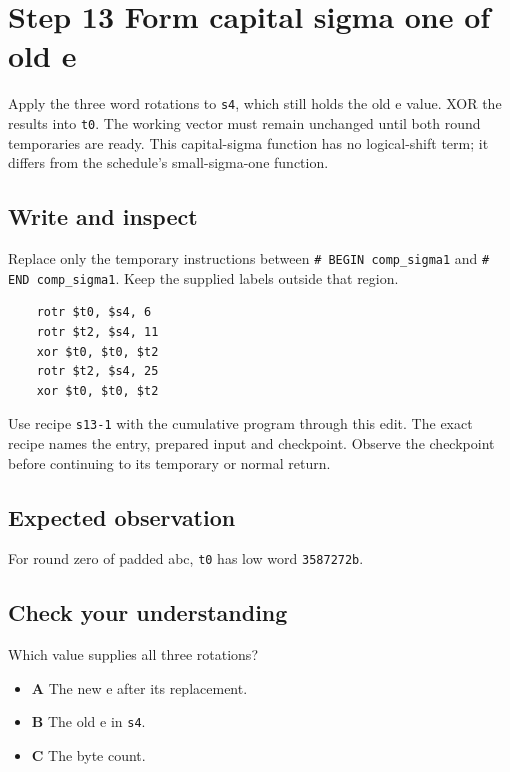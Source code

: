\section{Step 13 Form capital sigma one of old e}\label{sha-s13}

Apply the three word rotations to \texttt{s4}, which still holds the old e value. XOR the results into \texttt{t0}. The working vector must remain unchanged until both round temporaries are ready. This capital-sigma function has no logical-shift term; it differs from the schedule's small-sigma-one function.

\subsection{Write and inspect}
Replace only the temporary instructions between \texttt{\# BEGIN comp\_sigma1} and \texttt{\# END comp\_sigma1}. Keep the supplied labels outside that region.

\begin{verbatim}
    rotr $t0, $s4, 6
    rotr $t2, $s4, 11
    xor $t0, $t0, $t2
    rotr $t2, $s4, 25
    xor $t0, $t0, $t2
\end{verbatim}

Use recipe \texttt{s13-1} with the cumulative program through this edit. The exact recipe names the entry, prepared input and checkpoint. Observe the checkpoint before continuing to its temporary or normal return.

\subsection{Expected observation}
For round zero of padded abc, \texttt{t0} has low word \texttt{3587272b}.

\subsection{Check your understanding}
Which value supplies all three rotations?

\begin{itemize}
  \item \textbf{A} The new e after its replacement.
  \item \textbf{B} The old e in \texttt{s4}.
  \item \textbf{C} The byte count.
\end{itemize}
